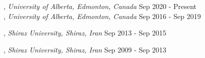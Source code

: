 , \textit{University of Alberta, Edmonton, Canada}	\hfill Sep 2020 - Present\\

, \textit{University of Alberta, Edmonton, Canada}	\hfill Sep 2016 -  Sep 2019

, \textit{Shiraz University, Shiraz, Iran} \hfill	Sep 2013 - Sep 2015

, \textit{Shiraz University, Shiraz, Iran} \hfill	Sep 2009 - Sep 2013

